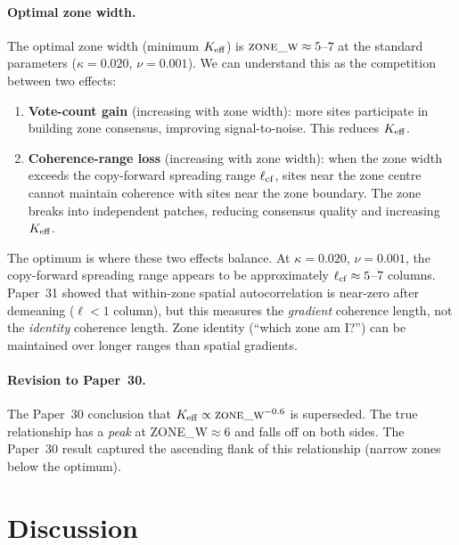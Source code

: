 \documentclass[11pt,a4paper]{article}
\begin{document}
\paragraph{Optimal zone width.}
The optimal zone width (minimum $K_{\rm eff}$) is $\textsc{zone\_w} \approx 5$--$7$
at the standard parameters ($\kappa=0.020$, $\nu=0.001$).  We can understand this
as the competition between two effects:

\begin{enumerate}
  \item \textbf{Vote-count gain} (increasing with zone width): more sites participate
    in building zone consensus, improving signal-to-noise.  This reduces $K_{\rm eff}$.
  \item \textbf{Coherence-range loss} (increasing with zone width): when the zone
    width exceeds the copy-forward spreading range $\ell_{\rm cf}$, sites near the
    zone centre cannot maintain coherence with sites near the zone boundary.
    The zone breaks into independent patches, reducing consensus quality and increasing
    $K_{\rm eff}$.
\end{enumerate}

The optimum is where these two effects balance.  At $\kappa=0.020$, $\nu=0.001$, the
copy-forward spreading range appears to be approximately $\ell_{\rm cf} \approx 5$--$7$
columns.  Paper~31 showed that within-zone spatial autocorrelation is near-zero after
demeaning ($\ell<1$ column), but this measures the \emph{gradient} coherence length, not
the \emph{identity} coherence length.  Zone identity (``which zone am I?'') can be
maintained over longer ranges than spatial gradients.

\paragraph{Revision to Paper~30.}
The Paper~30 conclusion that $K_{\rm eff} \propto \textsc{zone\_w}^{-0.6}$ is
superseded.  The true relationship has a \emph{peak} at ZONE\_W$\approx 6$ and falls
off on both sides.  The Paper~30 result captured the ascending flank of this relationship
(narrow zones below the optimum).

\section{Discussion}
\label{sec:discussion}
\end{document}
